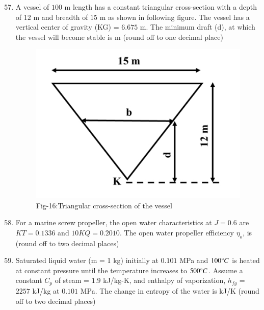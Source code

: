 \documentclass[journal]{IEEEtran}
\theoremstyle{remark}
\begin{document}
\begin{enumerate}[itemsep=1em]
\setcounter{enumi}{56}
\item A vessel of $100$ m length has a constant triangular cross-section with a depth of $12$ m and breadth of $15$ m as shown in following figure. The vessel has a vertical center of gravity (KG) = $6.675$ m. The minimum draft (d), at which the vessel 
will become stable is \underline{\hspace{1cm}} m (round off to one decimal place)
\begin{figure}[H]
    \centering
    \includegraphics[width=0.4\columnwidth]{figs/fig-16.jpeg}
    \caption*{Fig-16:Triangular cross-section of the vessel}
    \label{fig-16}
\end{figure}

\end{enumerate}

\begin{enumerate}[itemsep=1em]
\setcounter{enumi}{57}
\item For a marine screw propeller, the open water characteristics at $J = 0.6$ are $KT  = 0.1336$ and $10KQ = 0.2010$. The open water propeller efficiency $\eta_o$, is 
\underline{\hspace{2cm}} (round off to two decimal places) 
\end{enumerate}

\begin{enumerate}[itemsep=1em]
\setcounter{enumi}{58}
\item Saturated liquid water (m = 1 kg) initially at $0.101$ MPa and $100\degree C$ is heated at constant pressure until the temperature increases to $500\degree C$. Assume a constant 
$C_p$ of steam = $1.9$ kJ/kg-K, and enthalpy of vaporization, $h_{fg}$ = $2257$ kJ/kg at $0.101$ MPa. The change in entropy of the water is \underline{\hspace{2cm}} kJ/K (round off to two decimal places) 
\end{enumerate}

\newpage
\vspace*{0.25cm}
\end{document}
